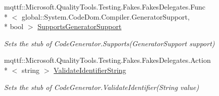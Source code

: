 \begin{DoxyCompactItemize}
mqttf\-::\-Microsoft.\-Quality\-Tools.\-Testing.\-Fakes.\-Fakes\-Delegates.\-Func\\*
$<$ global\-::\-System.\-Code\-Dom.\-Compiler.\-Generator\-Support, \\*
bool $>$ \hyperlink{class_system_1_1_code_dom_1_1_compiler_1_1_fakes_1_1_stub_code_compiler_ac4f66bc0cfb28b3da599e124e0e2b132}{Supports\-Generator\-Support}
\begin{DoxyCompactList}\small\item\em Sets the stub of Code\-Generator.\-Supports(\-Generator\-Support support)\end{DoxyCompactList}\item 
mqttf\-::\-Microsoft.\-Quality\-Tools.\-Testing.\-Fakes.\-Fakes\-Delegates.\-Action\\*
$<$ string $>$ \hyperlink{class_system_1_1_code_dom_1_1_compiler_1_1_fakes_1_1_stub_code_compiler_a1f36c54238591c165ce1eb61479c1a26}{Validate\-Identifier\-String}
\begin{DoxyCompactList}\small\item\em Sets the stub of Code\-Generator.\-Validate\-Identifier(\-String value)\end{DoxyCompactList}\end{DoxyCompactItemize}

